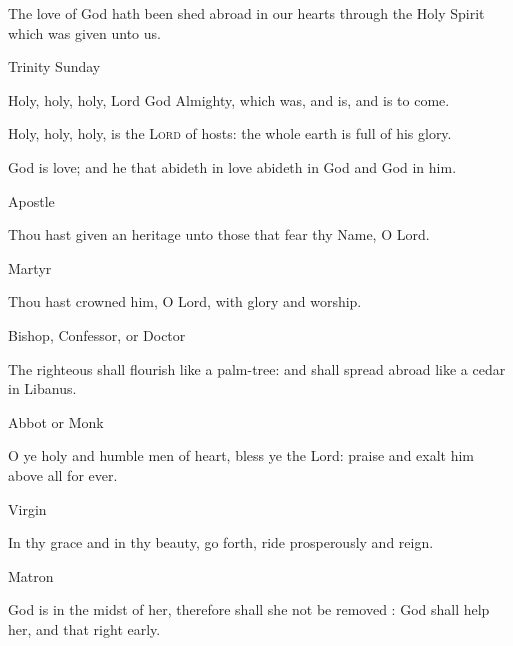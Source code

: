 \begin{multicols}{2}
    The love of God hath been shed abroad in our hearts through the Holy Spirit which was given unto us.
\begin{inhead}
Trinity Sunday
\end{inhead}\noindent
    Holy, holy, holy, Lord God Almighty, which was, and is, and is to come.
    \par
    Holy, holy, holy, is the \textsc{Lord} of hosts: the whole earth is full of his glory. 
    \par
    God is love; and he that abideth in love abideth in God and God in him.

\begin{inhead}
Apostle
\end{inhead}\noindent
Thou hast given an heritage unto those that fear thy Name, O Lord.

\begin{inhead}
Martyr
\end{inhead}\noindent
Thou hast crowned him, O Lord, with glory and worship.

\begin{inhead}
Bishop, Confessor, or Doctor
\end{inhead}\noindent
The righteous shall flourish like a palm-tree: and shall spread abroad like a cedar in
Libanus.

\begin{inhead}
Abbot or Monk
\end{inhead}\noindent
O ye holy and humble men of heart, bless ye the Lord: praise and exalt him above all for ever.

\begin{inhead}
Virgin
\end{inhead}\noindent
In thy grace and in thy beauty, go forth, ride prosperously and reign.

\begin{inhead}
Matron
\end{inhead}\noindent
God is in the midst of her, therefore shall she not be removed : God shall help her, and that right early.


\end{multicols}
